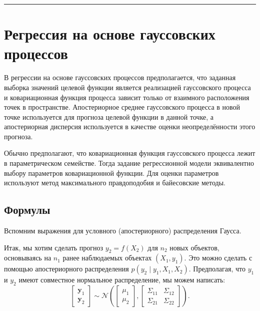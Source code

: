 \documentclass[11pt,a4paper]{article}
\begin{document}
    \begin{center}\rule{0.5\linewidth}{0.5pt}\end{center}

    \hypertarget{ux440ux435ux433ux440ux435ux441ux441ux438ux44f-ux43dux430-ux43eux441ux43dux43eux432ux435-ux433ux430ux443ux441ux441ux43eux432ux441ux43aux438ux445-ux43fux440ux43eux446ux435ux441ux441ux43eux432}{%
\section{Регрессия на основе гауссовских
процессов}\label{ux440ux435ux433ux440ux435ux441ux441ux438ux44f-ux43dux430-ux43eux441ux43dux43eux432ux435-ux433ux430ux443ux441ux441ux43eux432ux441ux43aux438ux445-ux43fux440ux43eux446ux435ux441ux441ux43eux432}}

    В регрессии на основе гауссовских процессов предполагается, что заданная
выборка значений целевой функции является реализацией гауссовского
процесса и ковариационная функция процесса зависит только от взаимного
расположения точек в пространстве. Апостериорное среднее гауссовского
процесса в новой точке используется для прогноза целевой функции в
данной точке, а апостериорная дисперсия используется в качестве оценки
неопределённости этого прогноза.

Обычно предполагают, что ковариационная функция гауссовского процесса
лежит в параметрическом семействе. Тогда задание регрессионной модели
эквивалентно выбору параметров ковариационной функции. Для оценки
параметров используют метод максимального правдоподобия и байесовские
методы.

    \hypertarget{ux444ux43eux440ux43cux443ux43bux44b}{%
\subsection{Формулы}\label{ux444ux43eux440ux43cux443ux43bux44b}}

Вспомним выражения для условного (апостериорного) распределения Гаусса.

Итак, мы хотим сделать прогноз \(y_2 = f(X_2)\) для \(n_2\) новых
объектов, основываясь на \(n_1\) ранее наблюдаемых объектах
\((X_1,y_1)\). Это можно сделать с помощью апостериорного распределения
\(p(y_2 \mid y_1, X_1, X_2)\). Предполагая, что \(y_1\) и \(y_2\) имеют
совместное нормальное распределение, мы можем написать:
\[
\left[\begin{array}{c} \mathbf{y}_{1} \\ \mathbf{y}_{2} \end{array}\right]
\sim
\mathcal{N} \left(
\left[\begin{array}{c} \mu_{1} \\ \mu_{2} \end{array}\right],
\left[ \begin{array}{cc}
\Sigma_{11} & \Sigma_{12} \\
\Sigma_{21} & \Sigma_{22}
\end{array} \right]
\right).
\]
\end{document}
